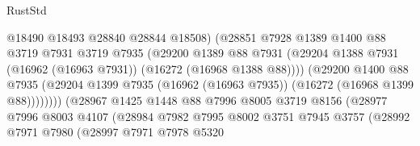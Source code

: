 \begin{lexlean}{RustStd}
\begin{coremodule}
                                      @18490
                                      @18493
                                      @28840
                                      @28844
                                      @18508)
                                    (@28851
                                      @7928
                                      @1389
                                      @1400
                                      @88
                                      @3719
                                      @7931
                                      @3719
                                      @7935
                                      (@29200
                                        @1389
                                        @88
                                        @7931
                                        (@29204
                                          @1388
                                          @7931
                                          (@16962 (@16963 @7931))
                                          (@16272 (@16968 @1388 @88))))
                                      (@29200
                                        @1400
                                        @88
                                        @7935
                                        (@29204
                                          @1399
                                          @7935
                                          (@16962 (@16963 @7935))
                                          (@16272 (@16968 @1399 @88))))))))
                              (@28967
                                @1425
                                @1448
                                @88
                                @7996
                                @8005
                                @3719
                                @8156
                                (@28977
                                  @7996
                                  @8003
                                  @4107
                                  (@28984
                                    @7982
                                    @7995
                                    @8002
                                    @3751
                                    @7945
                                    @3757
                                    (@28992
                                      @7971
                                      @7980
                                      (@28997
                                        @7971
                                        @7978
                                        @5320

\end{coremodule}
\end{lexlean}
